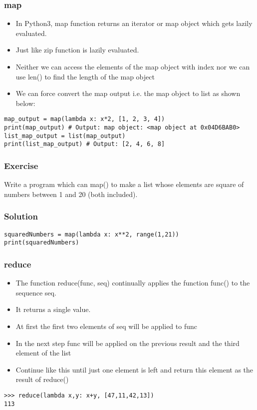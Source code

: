 \begin{frame}[fragile]\frametitle{map}
    \begin{itemize}
    \item  In Python3, map function returns an iterator or map object which gets lazily evaluated. 
    \item Just like zip function is lazily evaluated.
    \item Neither we can access the elements of the map object with index nor we can use len() to find the length of the map object
\item We can force convert the map output i.e. the map object to list as shown below:
    \end{itemize}
    	    \begin{lstlisting}
map_output = map(lambda x: x*2, [1, 2, 3, 4])
print(map_output) # Output: map object: <map object at 0x04D6BAB0>
list_map_output = list(map_output)
print(list_map_output) # Output: [2, 4, 6, 8]
\end{lstlisting}
\end{frame}

\begin{frame}[fragile]\frametitle{Exercise}
Write a program which can map() to make a list whose elements are square of numbers between 1 and 20 (both included).



\end{frame}

\begin{frame}[fragile]\frametitle{Solution}
\begin{lstlisting}
squaredNumbers = map(lambda x: x**2, range(1,21))
print(squaredNumbers)
\end{lstlisting}
\end{frame}


\begin{frame}[fragile]\frametitle{reduce}
    \begin{itemize}
    \item  The function reduce(func, seq) continually applies the function func() to the sequence seq.
    \item It returns a single value. 
    \item At first the first two elements of seq will be applied to func
    \item In the next step func will be applied on the previous result and the third element of the list
    \item Continue like this until just one element is left and return this element as the result of reduce()
    \end{itemize}
    	    \begin{lstlisting}
>>> reduce(lambda x,y: x+y, [47,11,42,13])
113
\end{lstlisting}
\end{frame}


